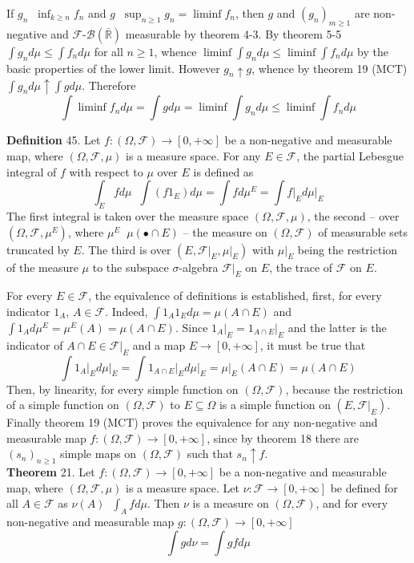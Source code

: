\documentclass[a4paper]{article}
\newcommand{\clo}[1]{\left [ #1 \right ]}
\newcommand{\brac}[1]{\left ( #1 \right )}
\newcommand{\induc}[1]{\left . #1 \right \vert}
\newcommand{\Rbar}{{\bar{\mathbb{R}}}}
\newcommand{\Zinf}{\clo{ 0, +\infty }}
\newcommand{\Fcal}{\mathcal{F}}
\newcommand{\borel}[1]{\mathcal{B}\brac{#1}}
\newcommand{\defn}{\mathop{\overset{\Delta}{=}}\nolimits}
\begin{document}
If $g_n\defn \inf_{k\geq n} f_n$ and $g\defn \sup_{n\geq1} g_n = \liminf f_n$, then $g$ and $\brac{g_n}_{m\geq1}$ are non-negative and $\Fcal $-$\borel{\Rbar}$ measurable by theorem 4-3. By theorem 5-5 $\int g_n d\mu\leq \int f_n d\mu$ for all $n\geq 1$, whence $\liminf \int g_n d\mu\leq \liminf \int f_n d\mu$ by the basic properties of the lower limit. However $g_n\uparrow g$, whence by theorem 19 (MCT) $\int g_n d\mu \uparrow \int g d\mu$. Therefore \[\int \liminf f_n d\mu = \int g d\mu = \liminf \int g_n d\mu \leq \liminf \int f_n d\mu\]

\noindent \textbf{Definition} 45.
Let $f:\brac{\Omega, \Fcal}\to\Zinf$ be a non-negative and measurable map, where $\brac{\Omega, \Fcal, \mu}$ is a measure space. For any $E\in \Fcal$, the partial Lebesgue integral of $f$ with respect to $\mu$ over $E$ is defined as \[\int_E fd\mu \defn \int \brac{f 1_E} d\mu = \int f d\mu^E = \int \induc{f}_E d\induc{\mu}_E\] The first integral is taken over the measure space $\brac{\Omega, \Fcal, \mu}$, the second -- over $\brac{\Omega, \Fcal, \mu^E}$, where $\mu^E \defn \mu\brac{\bullet\cap E}$ -- the measure on $\brac{\Omega, \Fcal}$ of measurable sets truncated by $E$. The third is over $\brac{E, \induc{\Fcal}_E, \induc{\mu}_E}$ with $\induc{\mu}_E$ being the restriction of the measure $\mu$ to the subspace $\sigma$-algebra $\induc{\Fcal}_E$ on $E$, the trace of $\Fcal$ on $E$. 

For every $E\in \Fcal$, the equivalence of definitions is established, first, for every indicator $1_A$, $A\in \Fcal$. Indeed, $\int 1_A 1_E d\mu = \mu\brac{A\cap E}$ and $\int 1_A d\mu^E = \mu^E\brac{A} = \mu\brac{A\cap E}$. Since $\induc{1_A}_E = \induc{1_{A\cap E}}_E$ and the latter is the indicator of $A\cap E\in \induc{\Fcal}_E$ and a map $E\to \Zinf$, it must be true that \[\int \induc{1_A}_E d\induc{\mu}_E = \int \induc{1_{A\cap E}}_E d\induc{\mu}_E = \induc{\mu}_E\brac{A\cap E} = \mu\brac{A \cap E}\] Then, by linearity, for every simple function on $\brac{\Omega, \Fcal}$, because the restriction of a simple function on $\brac{\Omega, \Fcal}$ to $E\subseteq \Omega$ is a simple function on $\brac{E, \induc{\Fcal}_E}$. Finally theorem 19 (MCT) proves the equivalence for any non-negative and measurable map $f:\brac{\Omega, \Fcal}\to\Zinf$, since by theorem 18 there are $\brac{s_n}_{n\geq1}$ simple maps on $\brac{\Omega, \Fcal}$ such that $s_n\uparrow f$.\\

\label{thm:int_meas} \noindent \textbf{Theorem} 21.
Let $f:\brac{\Omega, \Fcal}\to\Zinf$ be a non-negative and measurable map, where $\brac{\Omega, \Fcal, \mu}$ is a measure space. Let $\nu:\Fcal\to\Zinf$ be defined for all $A\in \Fcal$ as $\nu\brac{A} \defn \int_A f d\mu$. Then $\nu$ is a measure on $\brac{\Omega, \Fcal}$, and for every non-negative and measurable map $g:\brac{\Omega, \Fcal}\to\Zinf$ \[\int g d\nu =\int g f d\mu\]
\end{document}

